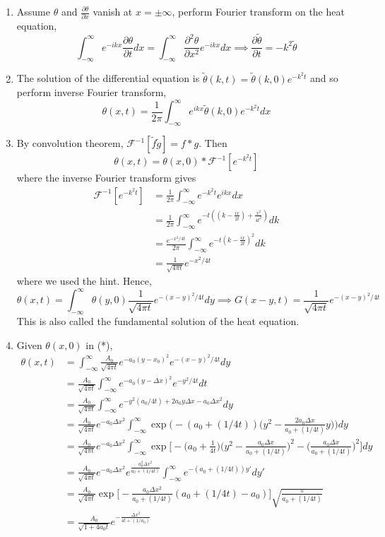 \documentclass[a4paper]{article}
\begin{document}
\begin{ans}\leavevmode
\begin{enumerate}[label=(\roman*)]
\item Assume $\theta$ and $\frac{\partial\theta}{\partial x}$ vanish at $x=\pm\infty$, perform Fourier transform on the heat equation,
$$\int_{-\infty}^\infty e^{-ikx}\frac{\partial\theta}{\partial t}dx=\int_{-\infty}
^\infty\frac{\partial^2\theta}{\partial x^2}e^{-ikx}dx\implies\frac{\partial\tilde{\theta}}{\partial t}=-k^2\tilde{\theta}$$
\item The solution of the differential equation is $\tilde{\theta}(k,t)=\tilde{\theta}(k,0)e^{-k^2t}$ and so perform inverse Fourier transform,
$$\theta(x,t)=\frac{1}{2\pi}\int_{-\infty}^\infty e^{ikx}\tilde{\theta}(k,0)e^{-k^2t}dx$$
\item By convolution theorem, $\mathcal{F}^{-1}[\tilde{f}\tilde{g}]=f*g$. Then
$$\theta(x,t)=\theta(x,0)*\mathcal{F}^{-1}[e^{-k^2t}]$$
where the inverse Fourier transform gives
\begin{align}
    \mathcal{F}^{-1}[e^{-k^2t}]&=\frac{1}{2\pi}\int_{-\infty}^\infty e^{-k^2t}e^{ikx}dx\nonumber\\&=\frac{1}{2\pi}\int_{-\infty}^\infty e^{-t((k-\frac{ix}{2t})+\frac{x^2}{4t^2})}dk\nonumber\\&=\frac{e^{-x^2/4t}}{2\pi}\int_{-\infty}
^\infty e^{-t(k-\frac{ix}{2t})^2}dk\nonumber\\&=\frac{1}{\sqrt{4\pi t}}e^{-x^2/4t}\nonumber
\end{align}
where we used the hint. Hence,
$$\theta(x,t)=\int_{-\infty}^\infty\theta(y,0)\frac{1}{\sqrt{4\pi t}}e^{-(x-y)^2/4t}dy\implies G(x-y,t)=\frac{1}{\sqrt{4\pi t}}e^{-(x-y)^2/4t}$$
This is also called the fundamental solution of the heat equation.
\item Given $\theta(x,0)$ in (*),
\begin{align}
\theta(x,t)&=\int_{-\infty}^\infty\frac{A_0}{\sqrt{4\pi t}}e^{-a_0(y-x_0)^2}e^{-(x-y)^2/4t}dy\nonumber\\&=\frac{A_0}{\sqrt{4\pi t}}\int_{-\infty}
^\infty e^{-a_0(y-\Delta x)^2}e^{-y^2/4t}dt\nonumber\\&=\frac{A_0}{\sqrt{4\pi t}}\int_{-\infty}^\infty e^{-y^2(a_0/4t)+2a_0y\Delta x-a_0\Delta x^2}dy\nonumber\\&=\frac{A_0}{\sqrt{4\pi t}}e^{-a_0\Delta x^2}\int_{-\infty}^\infty \exp\bigg(-(a_0+(1/4t))\bigg(y^2-\frac{2a_0\Delta x}{a_0+(1/4t)}y\bigg)\bigg)dy\nonumber\\&=\frac{A_0}{\sqrt{4\pi t}}e^{-a_0\Delta x^2}\int_{-\infty}^\infty\exp\bigg[-\bigg(a_0+\frac{1}{4t}\bigg)\bigg(y^2-\frac{a_0\Delta x}{a_0+(1/4t)}\bigg)^2-\bigg(\frac{a_0\Delta x}{a_0+(1/4t)}\bigg)^2\bigg]dy\nonumber\\&=\frac{A_0}{\sqrt{4\pi t}}e^{-a_0\Delta x^2}e^{\frac{a_0^2\Delta x^2}{a_0+(1/4t)}}\int_{-\infty}^\infty e^{-(a_0+(1/4t))y'}dy'\nonumber\\&=\frac{A_0}{\sqrt{4\pi t}}\exp\bigg[-\frac{a_0\Delta x^2}{a_0+(1/4t)}(a_0+(1/4t)-a_0)\bigg]\sqrt{\frac{\pi}{a_0+(1/4t)}}\nonumber\\&=\frac{A_0}{\sqrt{1+4a_0t}}e^{-\frac{\Delta x^2}{4t+(1/a_0)}}\nonumber

\end{align}
\end{enumerate}
\end{ans}
\end{document}
